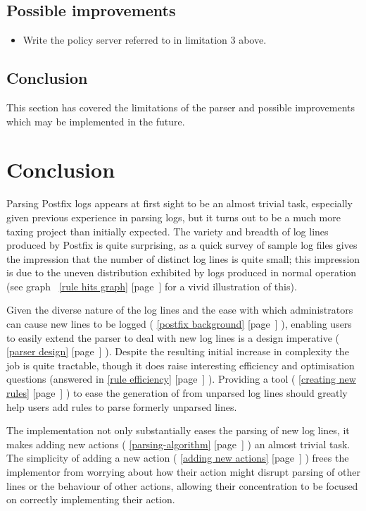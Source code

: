 \documentclass[a4paper,12pt,draft]{article}
\newcommand{\refwithpage}[1]{%
    \empty{}\ref{#1} [page~\pageref{#1}]%
}
\newcommand{\sectionref}[1]{%
    \textsection{}\refwithpage{#1}%
}
\begin{document}
\subsection{Possible improvements}

\begin{itemize}

    \item Write the policy server referred to in limitation 3 above.

\end{itemize}

\subsection{Conclusion}

This section has covered the limitations of the parser and possible
improvements which may be implemented in the future.

\newpage
\section{Conclusion}

\label{conclusion}

Parsing Postfix logs appears at first sight to be an almost trivial task,
especially given previous experience in parsing logs, but it turns out to
be a much more taxing project than initially expected.  The variety and
breadth of log lines produced by Postfix is quite surprising, as a quick
survey of sample log files gives the impression that the number of distinct
log lines is quite small; this impression is due to the uneven distribution
exhibited by logs produced in normal operation (see graph~\refwithpage{rule
hits graph} for a vivid illustration of this).  


Given the diverse nature of the log lines and the ease with which
administrators can cause new lines to be logged (\sectionref{postfix
background}), enabling users to easily extend the parser to deal with new
log lines is a design imperative (\sectionref{parser design}).  Despite the
resulting initial increase in complexity the job is quite tractable, though
it does raise interesting efficiency and optimisation questions (answered
in \sectionref{rule efficiency}).  Providing a tool (\sectionref{creating
new rules}) to ease the generation of \regexes{} from unparsed log lines
should greatly help users add rules to parse formerly unparsed lines.


The implementation not only substantially eases the parsing of new log
lines, it makes adding new actions (\sectionref{parsing-algorithm}) an
almost trivial task.  The simplicity of adding a new action
(\sectionref{adding new actions}) frees the implementor from worrying about
how their action might disrupt parsing of other lines or the behaviour of
other actions, allowing their concentration to be focused on correctly
implementing their action.
\end{document}
